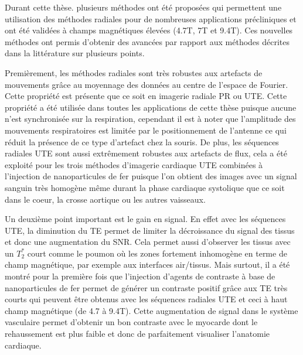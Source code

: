 Durant cette thèse. plusieurs méthodes ont été proposées qui permettent une utilisation des méthodes radiales pour de nombreuses applications précliniques et ont été validées à champs magnétiques élevées (4.7T, 7T et 9.4T).
Ces nouvelles méthodes ont permis d'obtenir des avancées par rapport aux méthodes décrites dans la littérature sur plusieurs points.

Premièrement, les méthodes radiales sont très robustes aux artefacts de mouvements grâce au moyennage des données au centre de l'espace de Fourier. Cette propriété est présente que ce soit en imagerie radiale PR ou UTE. Cette propriété a été utilisée dans toutes les applications de cette thèse puisque aucune n'est synchronisée sur la respiration, cependant il est à noter que l'amplitude des mouvements respiratoires est limitée par le positionnement de l'antenne ce qui réduit la présence de ce type d'artefact chez la souris. 
De plus, les séquences radiales UTE sont aussi extrêmement robustes aux artefacts de flux, cela a été exploité pour les trois méthodes d'imagerie cardiaque UTE combinées à l'injection de nanoparticules de fer puisque l'on obtient des images avec un signal sanguin très homogène même durant la phase cardiaque systolique que ce soit dans le coeur, la crosse aortique ou les autres vaisseaux.

Un deuxième point important est le gain en signal. En effet avec les séquences UTE, la diminution du TE permet de limiter la décroissance du signal des tissus et donc une augmentation du SNR. Cela permet aussi d'observer les tissus avec un $T_2^*$ court comme le poumon où les zones fortement inhomogène en terme de champ magnétique, par exemple aux interfaces air/tissus. Mais surtout, il a été montré pour la première fois que l'injection d'agents de contraste à base de nanoparticules de fer permet de générer un contraste positif grâce aux TE très courts qui peuvent être obtenus avec les séquences radiales UTE et ceci à haut champ magnétique (de 4.7 à 9.4T). Cette augmentation de signal dans le système vasculaire permet d'obtenir un bon contraste avec le myocarde dont le rehaussement est plus faible et donc de parfaitement visualiser l'anatomie cardiaque.

